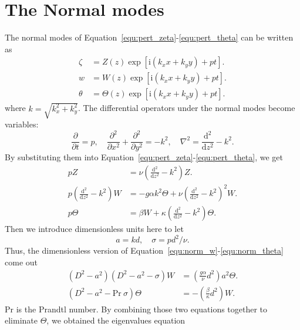 \section{\label{sec:meth:norm}The Normal modes}

The normal modes of Equation~\ref{equ:pert_zeta}-\ref{equ:pert_theta} can be written as
\begin{align}
	\zeta&=Z\left( z \right)\exp\left[ \mathrm{i}\left( k_x x+k_y y \right)+pt \right]. \label{equ:norm_zeta} \\
	w&=W\left( z \right)\exp\left[ \mathrm{i}\left( k_x x+k_y y \right)+pt \right]. \label{equ:norm_w} \\
	\theta&=\Theta\left( z \right)\exp\left[ \mathrm{i}\left( k_x x+k_y y \right)+pt \right]. \label{equ:norm_theta}
\end{align}
where \(k=\sqrt{k_x^2+k_y^2}\). The differential operators under the normal modes become variables:
\begin{equation}
	\frac{\partial}{\partial t}=p,\quad \frac{\partial^2}{\partial x^2}+\frac{\partial^2}{\partial y^2}=-k^2,\quad \nabla^2=\frac{\mathrm{d}^2}{\mathrm{d}z^2}-k^2.
\end{equation}
By substituting them into Equation~\ref{equ:pert_zeta}-\ref{equ:pert_theta}, we get
\begin{align}
	pZ&=\nu\left( \frac{\mathrm{d}^2}{\mathrm{d}z^2}-k^2 \right)Z. \label{equ:zeta} \\
	p\left( \frac{\mathrm{d}^2}{\mathrm{d}z^2}-k^2 \right)W&=-g\alpha k^2\Theta+\nu\left( \frac{\mathrm{d}^2}{\mathrm{d}z^2}-k^2 \right)^2 W. \label{equ:w} \\
	p\Theta&=\beta W+\kappa\left( \frac{\mathrm{d}^2}{\mathrm{d}z^2}-k^2 \right)\Theta. \label{equ:theta}
\end{align}
Then we introduce dimensionless units here to let
\begin{equation}
	a=kd,\quad\sigma=pd^2/\nu.
	\label{equ:dimensionless}
\end{equation}
Thus, the dimensionless version of Equation~\ref{equ:norm_w}-\ref{equ:norm_theta} come out
\begin{align}
	\left( D^2-a^2 \right)\left( D^2-a^2-\sigma \right)W&=\left( \frac{g\alpha}{\nu}d^2 \right)a^2\Theta. \label{equ:norm_w_dim_less} \\
	\left( D^2-a^2-\mathrm{Pr}~\sigma \right)\Theta&=-\left( \frac{\beta}{\kappa}d^2 \right)W.
\end{align}
\(\mathrm{Pr}\) is the Prandtl number. By combining those two equations together to eliminate \(\Theta\), we obtained the eigenvalues equation
